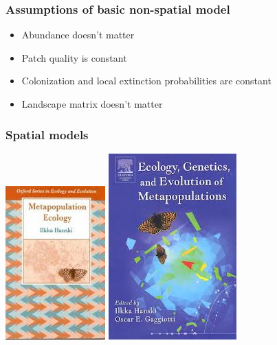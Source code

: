 \documentclass[color=usenames,dvipsnames]{beamer}\usepackage[]{graphicx}\usepackage[]{xcolor}
\begin{document}
\begin{frame}
  \frametitle{Assumptions of basic non-spatial model}
  \Large
  \begin{itemize}
    \item Abundance doesn't matter
    \item Patch quality is constant
    \item Colonization and local extinction probabilities are constant
    \item Landscape matrix doesn't matter %
  \end{itemize}
\end{frame}






\begin{frame}
  \frametitle{Spatial models}
  \begin{center}
    \includegraphics[height=0.7\textheight,keepaspectratio]{figs/metapop-e}
    \hspace{0.3cm}
    \includegraphics[height=0.7\textheight,keepaspectratio]{figs/metapop-ee}
  \end{center}
\end{frame}
\end{document}
